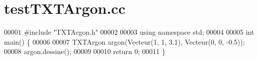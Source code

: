 \section{test\+T\+X\+T\+Argon.\+cc}
\label{test_t_x_t_argon_8cc_source}

\begin{DoxyCode}
00001 \textcolor{preprocessor}{#include "TXTArgon.h"}
00002 
00003 \textcolor{keyword}{using namespace }std;
00004 
00005 \textcolor{keywordtype}{int} main() \{
00006     
00007     TXTArgon argon(Vecteur(1, 1, 3.1), Vecteur(0, 0, -0.5));
00008     argon.dessine();
00009     
00010     \textcolor{keywordflow}{return} 0;
00011 \}
\end{DoxyCode}
